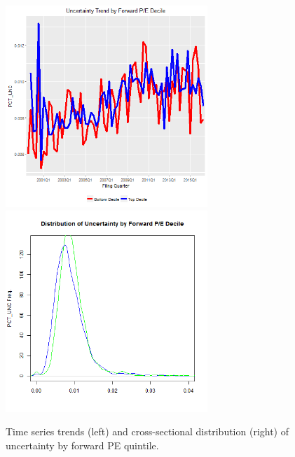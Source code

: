 \begin{figure}[H] 
\centering
\includegraphics[width=3in, height=3in]{figures/punc-by-pefwd-ts}
\includegraphics[width=3in, height=3in]{figures/punc-by-pefwd-xs}
\captionsetup{justification=centering, width=.95\textwidth} 
\caption{\footnotesize Time series trends (left) and cross-sectional distribution (right) of uncertainty by forward PE quintile.} \label{bunc-pefwd}
\end{figure} 
\newpage
